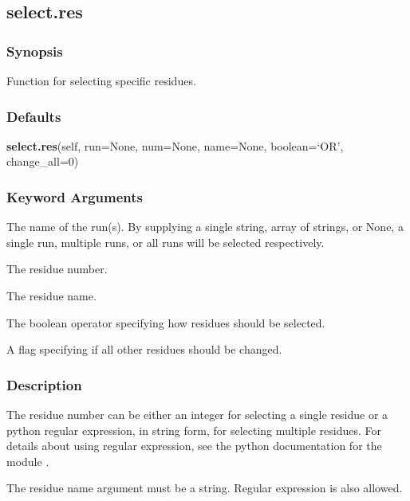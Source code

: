   

 \newpage 

 \subsection{select.res} 

  
 \subsubsection{Synopsis} 

 Function for selecting specific residues. 
  

  
 \subsubsection{Defaults} 

 \textsf{\textbf{select.res}(self, run=None, num=None, name=None, boolean=`OR', change\_all=0)} 

  
 \subsubsection{Keyword Arguments} 

   The name of the run(s).  By supplying a single string, array of strings, or None, a single run, multiple runs, or all runs will be selected respectively.   

   The residue number.   

   The residue name.   

   The boolean operator specifying how residues should be selected.   

   A flag specifying if all other residues should be changed.  

  

  
 \subsubsection{Description} 

 The residue number can be either an integer for selecting a single residue or a python regular expression, in string form, for selecting multiple residues.  For details about using regular expression, see the python documentation for the module . 
  

 The residue name argument must be a string.  Regular expression is also allowed. 
  


